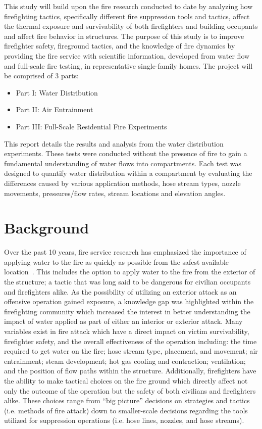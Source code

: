 \documentclass[12pt,oneside]{book}
\begin{document}
This study will build upon the fire research conducted to date by analyzing how firefighting tactics, specifically different fire suppression tools and tactics, affect the thermal exposure and survivability of both firefighters and building occupants and affect fire behavior in structures. The purpose of this study is to improve firefighter safety, fireground tactics, and the knowledge of fire dynamics by providing the fire service with scientific information, developed from water flow and full-scale fire testing, in representative single-family homes. The project will be comprised of 3 parts:

\begin{itemize}
	\setlength{\itemindent}{0.25in}
	\item Part I:  Water Distribution
	\item Part II: Air Entrainment
	\item Part III: Full-Scale Residential Fire Experiments
	\end{itemize}

This report details the results and analysis from the water distribution experiments. These tests were conducted without the presence of fire to gain a fundamental understanding of water flows into compartments. Each test was designed to quantify water distribution within a compartment by evaluating the differences caused by various application methods, hose stream types, nozzle movements, pressures/flow rates, stream locations and elevation angles. 


\chapter{Background}

Over the past 10 years, fire service research has emphasized the importance of applying water to the fire as quickly as possible from the safest available location~\cite{DHS2008,DHS2010}. This includes the option to apply water to the fire from the exterior of the structure; a tactic that was long said to be dangerous for civilian occupants and firefighters alike. As the possibility of utilizing an exterior attack as an offensive operation gained exposure, a knowledge gap was highlighted within the firefighting community which increased the interest in better understanding the impact of water applied as part of either an interior or exterior attack. Many variables exist in fire attack which have a direct impact on victim survivability, firefighter safety, and the overall effectiveness of the operation including: the time required to get water on the fire; hose stream type, placement, and movement; air entrainment; steam development; hot gas cooling and contraction; ventilation; and the position of flow paths within the structure. Additionally, firefighters have the ability to make tactical choices on the fire ground which directly affect not only the outcome of the operation but the safety of both civilians and firefighters alike. These choices range from ``big picture'' decisions on strategies and tactics (i.e. methods of fire attack) down to smaller-scale decisions regarding the tools utilized for suppression operations (i.e. hose lines, nozzles, and hose streams). 
\end{document}
